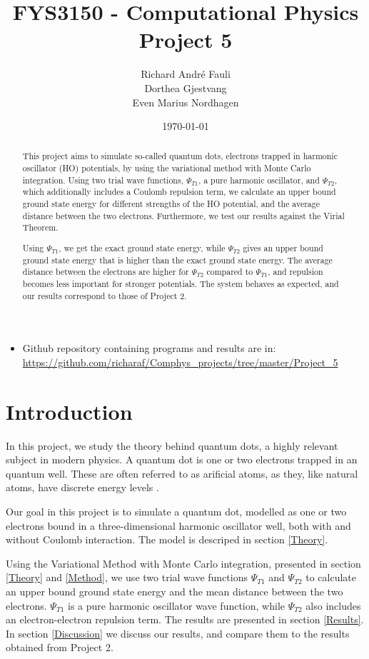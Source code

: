 \documentclass[norsk,a4paper,12pt]{article}
\title{FYS3150 - Computational Physics\\\vspace{2mm} \Large{Project 5}}
\author{\large Richard Andr\'e Fauli\\ Dorthea Gjestvang\\ Even Marius Nordhagen}
\date\today
\begin{document}
\maketitle
\begin{abstract}
This project aims to simulate so-called quantum dots, electrons trapped in harmonic oscillator (HO) potentials, by using the variational method with Monte Carlo integration. Using two trial wave functions, $\Psi_{T1}$, a pure harmonic oscillator, and $\Psi_{T2}$, which additionally includes a Coulomb repulsion term, we calculate an upper bound ground state energy for different strengths of the HO potential, and the average distance between the two electrons. Furthermore, we test our results against the Virial Theorem.\par

Using $\Psi_{T1}$, we get the exact ground state energy, while $\Psi_{T2}$ gives an upper bound ground state energy that is higher than the exact ground state energy. The average distance between the electrons are higher for $\Psi_{T2}$ compared to $\Psi_{T1}$, and repulsion becomes less important for stronger potentials. The system behaves as expected, and our results correspond to those of Project 2.
\par 

\end{abstract}


\begin{itemize}
\item Github repository containing programs and results are in: \url{https://github.com/richaraf/Comphys_projects/tree/master/Project_5}
\end{itemize}


\section{Introduction}
In this project, we study the theory behind quantum dots, a highly relevant subject in modern physics. A quantum dot is one or two electrons trapped in an quantum well. These are often referred to as arificial atoms, as they, like natural atoms, have discrete energy levels \cite{Nature}.

Our goal in this project is to simulate a quantum dot, modelled as one or two electrons bound in a three-dimensional harmonic oscillator well, both with and without Coulomb interaction. The model is descriped in section \ref{Theory}. \par

Using the Variational Method with Monte Carlo integration, presented in section \ref{Theory} and \ref{Method}, we use two trial wave functions $\Psi_{T1}$ and $\Psi_{T2}$ to calculate an upper bound ground state energy and the mean distance between the two electrons. $\Psi_{T1}$ is a pure harmonic oscillator wave function, while $\Psi_{T2}$ also includes an electron-electron repulsion term. The results are presented in section \ref{Results}. In section \ref{Discussion} we discuss our results, and compare them to the results obtained from Project 2.
\end{document}
